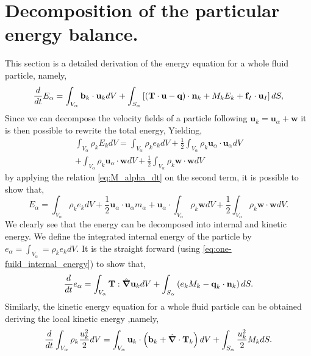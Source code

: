 \section{Decomposition of the particular energy balance.}
This section is a detailed derivation of the energy equation for a whole fluid particle, namely,
\begin{equation*}
    \label{ap:eq:E_alpha_dt}
    \frac{d}{d t} E_\alpha 
    = \int_{V_\alpha} \textbf{b}_k \cdot \textbf{u}_k dV
    + \int_{S_\alpha} \left[
        (\textbf{T}\cdot \textbf{u} 
    - \textbf{q})\cdot\textbf{n}_k 
    + M_k E_k 
    + \textbf{f}_I \cdot \textbf{u}_I 
    \right]dS, 
\end{equation*}
Since we can decompose the velocity fields of a particle following $\textbf{u}_k = \textbf{u}_\alpha + \textbf{w}$ it is then possible to rewrite the total energy, 
Yielding, 
\begin{multline*}
    \int_{V_\alpha} \rho_k E_k dV
    = \int_{V_\alpha} \rho_k e_k dV
    + \frac{1}{2} \int_{V_\alpha} \rho_k \textbf{u}_\alpha\cdot\textbf{u}_\alpha dV\\
    + \int_{V_\alpha} \rho_k \textbf{u}_\alpha\cdot\textbf{w} dV
    + \frac{1}{2} \int_{V_\alpha} \rho_k \textbf{w}\cdot\textbf{w} dV
\end{multline*}
by applying the relation \ref{eq:M_alpha_dt} on the second term, it is possible to show that,
\begin{equation*}
    E_\alpha
    = \int_{V_\alpha} \rho_k e_k dV
    + \frac{1}{2} \textbf{u}_\alpha\cdot\textbf{u}_\alpha  m_\alpha
    + \textbf{u}_\alpha\cdot \int_{V_\alpha} \rho_k \textbf{w} dV
    + \frac{1}{2} \int_{V_\alpha} \rho_k \textbf{w}\cdot\textbf{w} dV.
\end{equation*}
We clearly see that the energy can be decomposed into internal and kinetic energy. 
We define the integrated internal energy of the particle by $e_\alpha = \int_{V_\alpha} = \rho_k e_k dV$.
It is the straight forward (using \ref{eq:one-fuild_internal_energy}) to show that, 
\begin{equation*}
    \frac{d}{d t} e_\alpha
    = \int_{V_\alpha} \textbf{T}:\hat{\bm{\nabla}}\textbf{u}_k dV
    + \int_{S_\alpha} \left(
        e_k M_k
        - \textbf{q}_k \cdot \textbf{n}_k
    \right) dS.
\end{equation*}
Similarly, the kinetic energy equation for a whole fluid particle can be obtained deriving the local kinetic energy ,namely,
\begin{equation*}
    \frac{d}{d t} \int_{V_\alpha} \rho_k \frac{u_k^2}{2} dV
    = \int_{V_\alpha}\textbf{u}_k \cdot  \left(
        \textbf{b}_k
        + \hat{\bm{\nabla}} \cdot \textbf{T}_k
    \right)dV
    + \int_{S_\alpha} \frac{u_k^2}{2} M_k dS.
\end{equation*}
